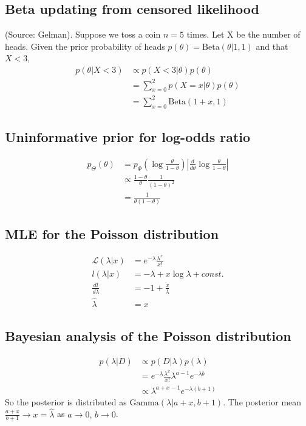 \subsection{Beta updating from censored likelihood}
(Source: Gelman). Suppose we toss a coin $n=5$ times. Let X be the number of heads. Given the prior probability of heads $p(\theta) = \mathrm{Beta}(\theta|1,1)$ and that $X<3$,
\begin{align*}
p(\theta|X<3) &\propto p(X<3|\theta)p(\theta)\\
&= \sum_{x=0}^2 p(X=x|\theta)p(\theta)\\
&= \sum_{x=0}^2 \mathrm{Beta}(1+x,1)
\end{align*}

\subsection{Uninformative prior for log-odds ratio}
\begin{align*}
p_\Theta(\theta) &= p_\Phi\left(\log\frac{\theta}{1-\theta}\right) \left|\frac{d}{d\theta}\log\frac{\theta}{1-\theta}\right|\\
&\propto \frac{1-\theta}{\theta} \frac{1}{(1-\theta)^2}\\
&= \frac{1}{\theta(1-\theta)}
\end{align*}

\subsection{MLE for the Poisson distribution}
\begin{align*}
\mathcal{L}(\lambda|x) &= e^{-\lambda}\frac{\lambda^x}{x!}\\
l(\lambda|x) &= -\lambda + x\log\lambda + const.\\
\frac{dl}{d\lambda} &= -1 + \frac{x}{\lambda}\\
\hat\lambda &= x
\end{align*}

\subsection{Bayesian analysis of the Poisson distribution}
\begin{align*}
p(\lambda|D) &\propto p(D|\lambda)p(\lambda)\\
&= e^{-\lambda}\frac{\lambda^x}{x!}\lambda^{a-1}e^{-\lambda b}\\
&\propto \lambda^{a+x-1}e^{-\lambda(b+1)}
\end{align*}
So the posterior is distributed as $\mathrm{Gamma}(\lambda|a+x,b+1)$. The posterior mean $\frac{a+x}{b+1} \rightarrow x = \hat\lambda$ as $a\rightarrow0,\,b\rightarrow0$.

